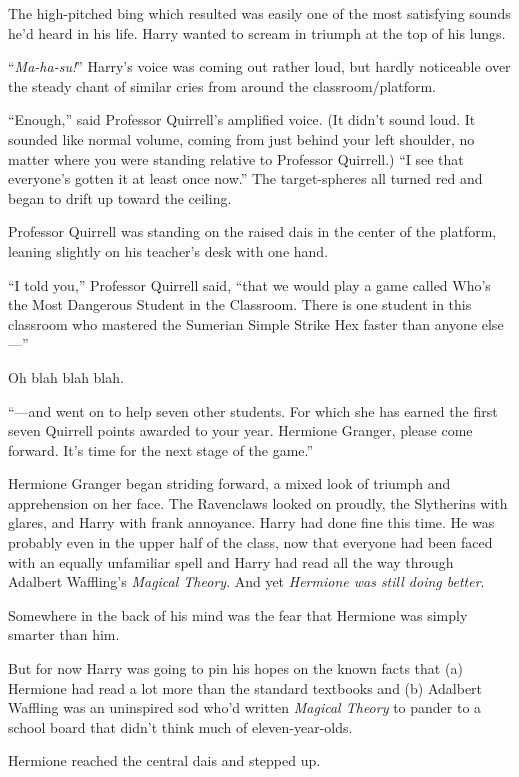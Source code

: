 The high-pitched bing which resulted was easily one of the most satisfying sounds he’d heard in his life. Harry wanted to scream in triumph at the top of his lungs. 

“\emph{Ma-ha-su!}” Harry’s voice was coming out rather loud, but hardly noticeable over the steady chant of similar cries from around the classroom/platform.

“Enough,” said Professor Quirrell’s amplified voice. (It didn’t sound loud. It sounded like normal volume, coming from just behind your left shoulder, no matter where you were standing relative to Professor Quirrell.) “I see that everyone’s gotten it at least once now.” The target-spheres all turned red and began to drift up toward the ceiling.

Professor Quirrell was standing on the raised dais in the center of the platform, leaning slightly on his teacher’s desk with one hand.

“I told you,” Professor Quirrell said, “that we would play a game called Who’s the Most Dangerous Student in the Classroom. There is one student in this classroom who mastered the Sumerian Simple Strike Hex faster than anyone else—”

Oh blah blah blah.

“—and went on to help seven other students. For which she has earned the first seven Quirrell points awarded to your year. Hermione Granger, please come forward. It’s time for the next stage of the game.”

Hermione Granger began striding forward, a mixed look of triumph and apprehension on her face. The Ravenclaws looked on proudly, the Slytherins with glares, and Harry with frank annoyance. Harry had done fine this time. He was probably even in the upper half of the class, now that everyone had been faced with an equally unfamiliar spell and Harry had read all the way through Adalbert Waffling’s \emph{Magical Theory}. And yet \emph{Hermione was still doing better}.

Somewhere in the back of his mind was the fear that Hermione was simply smarter than him.

But for now Harry was going to pin his hopes on the known facts that (a) Hermione had read a lot more than the standard textbooks and (b) Adalbert Waffling was an uninspired sod who’d written \emph{Magical Theory} to pander to a school board that didn’t think much of eleven-year-olds.

Hermione reached the central dais and stepped up.

